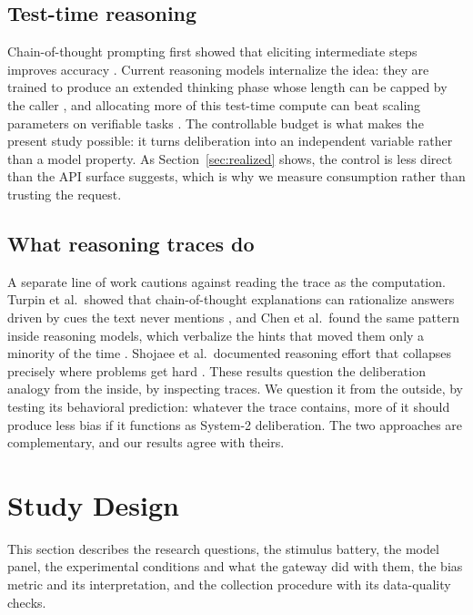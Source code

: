 \documentclass[conference]{IEEEtran}
\begin{document}
\subsection{Test-time reasoning}
Chain-of-thought prompting first showed that eliciting intermediate steps improves accuracy \cite{wei2022chain}. Current reasoning models internalize the idea: they are trained to produce an extended thinking phase whose length can be capped by the caller \cite{jaech2024openai, guo2025deepseek, yang2025qwen3}, and allocating more of this test-time compute can beat scaling parameters on verifiable tasks \cite{snell2024scaling, muennighoff2025s1}. The controllable budget is what makes the present study possible: it turns deliberation into an independent variable rather than a model property. As Section~\ref{sec:realized} shows, the control is less direct than the API surface suggests, which is why we measure consumption rather than trusting the request.

\subsection{What reasoning traces do}
A separate line of work cautions against reading the trace as the computation. Turpin et al.\ showed that chain-of-thought explanations can rationalize answers driven by cues the text never mentions \cite{turpin2023language}, and Chen et al.\ found the same pattern inside reasoning models, which verbalize the hints that moved them only a minority of the time \cite{chen2025reasoning}. Shojaee et al.\ documented reasoning effort that collapses precisely where problems get hard \cite{shojaee2025illusion}. These results question the deliberation analogy from the inside, by inspecting traces. We question it from the outside, by testing its behavioral prediction: whatever the trace contains, more of it should produce less bias if it functions as System-2 deliberation. The two approaches are complementary, and our results agree with theirs.

\section{Study Design}

This section describes the research questions, the stimulus battery, the model panel, the experimental conditions and what the gateway did with them, the bias metric and its interpretation, and the collection procedure with its data-quality checks.
\end{document}
